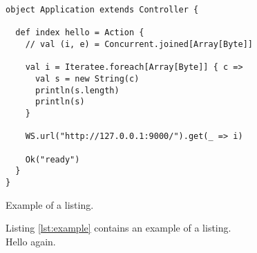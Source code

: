 
\begin{listing}[H]
\begin{verbatim}
object Application extends Controller {

  def index hello = Action {
    // val (i, e) = Concurrent.joined[Array[Byte]]

    val i = Iteratee.foreach[Array[Byte]] { c =>
      val s = new String(c)
      println(s.length)
      println(s)
    }

    WS.url("http://127.0.0.1:9000/").get(_ => i)

    Ok("ready")
  }
}
\end{verbatim}
\caption{Example of a listing.}
\label{lst:example}
\end{listing}

Listing \ref{lst:example} contains an example of a listing.
\\

Hello again.
